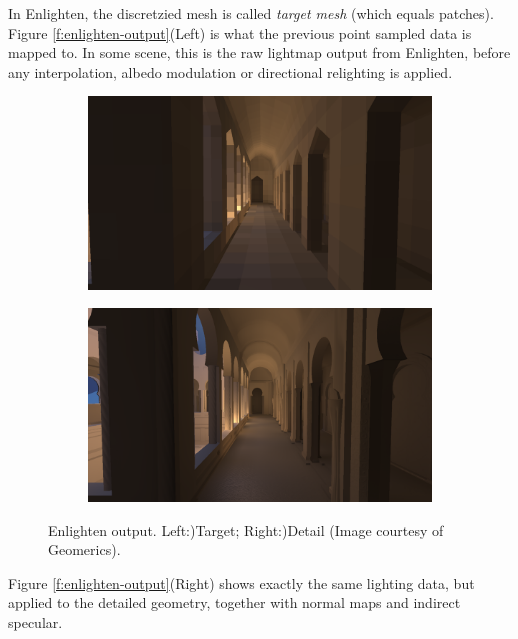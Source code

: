 In Enlighten, the discretzied mesh is called \textit{target mesh} (which equals patches). Figure \ref{f:enlighten-output}(Left) is what the previous point sampled data is mapped to. In some scene, this is the raw lightmap output from Enlighten, before any interpolation, albedo modulation or directional relighting is applied.

\begin{figure}\label{f:enlighten-output}
	\begin{subfigure}[b]{0.5\textwidth}
		\includegraphics[width=1.0\textwidth]{graphics/gi/path-29-6}
	\end{subfigure}
	\begin{subfigure}[b]{0.5\textwidth}
		\includegraphics[width=1.0\textwidth]{graphics/gi/path-29-7}
	\end{subfigure}
	\caption{Enlighten output. Left:)Target; Right:)Detail (Image courtesy of Geomerics).}
\end{figure}

Figure \ref{f:enlighten-output}(Right) shows exactly the same lighting data, but applied to the detailed geometry, together  with normal maps and indirect specular.



